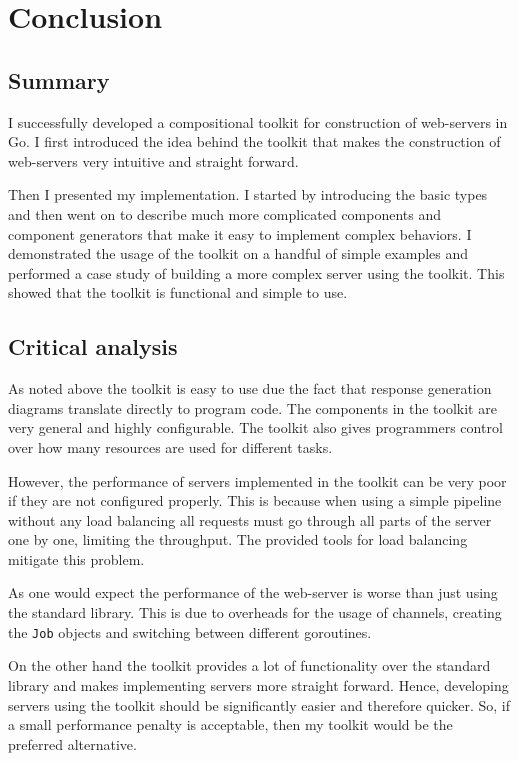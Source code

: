 \section{Conclusion}
\label{sec:conclusion}
\subsection{Summary}
I successfully developed a compositional toolkit for construction of 
web-servers in Go. I first introduced the idea behind the toolkit that 
makes the construction of web-servers very intuitive and straight forward. 

Then I presented my implementation. I started by introducing the basic types
and then went on to describe much more complicated components and component generators
that make it easy to implement complex behaviors. I demonstrated the usage of the 
toolkit on a handful of simple examples and performed a case study of building
a more complex server using the toolkit. This showed that the toolkit is
functional and simple to use. 


\subsection{Critical analysis}
As noted above the toolkit is easy to use due the fact that response 
generation diagrams translate directly to program code. The components
in the toolkit are very general and highly configurable. The toolkit
also gives programmers control over how many resources are used for 
different tasks. 

However, the performance of servers implemented in the toolkit can be 
very poor if they are not configured properly. This is because when using a simple
pipeline without any load balancing all requests must go through all parts
of the server one by one, limiting the throughput. The provided
tools for load balancing mitigate this problem.

As one would expect the performance of the web-server
is worse than just using the standard library. This is due to overheads
for the usage of channels, creating the \texttt{Job} objects
and switching between different goroutines.

On the other hand the toolkit provides a lot of functionality over the
standard library and makes implementing servers more straight forward. 
Hence, developing servers using the toolkit should be
significantly easier and therefore quicker. So, if a small performance
penalty is acceptable, then my toolkit would be the preferred alternative.

